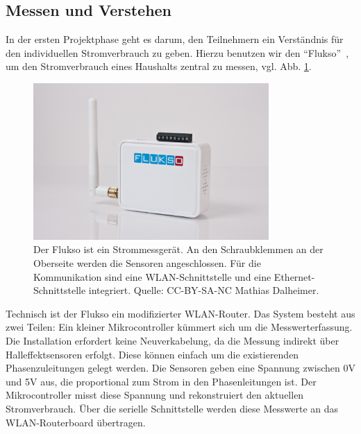 \documentclass[12pt,BCOR=8.5mm]{scrartcl}
\newcommand*\imgwidth{0.8\textwidth}
\begin{document}
\subsection{Messen und Verstehen}\label{sub:messenverstehen}

In der ersten Projektphase geht es darum, den Teilnehmern ein
Verständnis für den individuellen Stromverbrauch zu geben. Hierzu
benutzen wir den "`Flukso"'~\cite{web:flukso}, um den 
Stromverbrauch eines Haushalts zentral zu messen, vgl. 
Abb. \ref{fig:flukso}.
\begin{figure}[htbp]
  \begin{center}
    \includegraphics[width=\imgwidth]{figures/Flukso.jpg}
    \caption{Der Flukso ist ein Strommessgerät. An den Schraubklemmen
    an der Oberseite werden die Sensoren angeschlossen. Für die
    Kommunikation sind eine WLAN-Schnittstelle und eine
    Ethernet-Schnittstelle integriert. Quelle: CC-BY-SA-NC Mathias
    Dalheimer.}
    \label{fig:flukso}
  \end{center}
\end{figure}
Technisch ist der Flukso ein modifizierter WLAN-Router. Das System
besteht aus zwei Teilen: Ein kleiner Mikrocontroller kümmert sich um die
Messwerterfassung. Die Installation erfordert keine Neuverkabelung, da
die Messung indirekt über Halleffektsensoren erfolgt. Diese können
einfach um die existierenden Phasenzuleitungen gelegt werden. Die
Sensoren geben eine Spannung zwischen 0V und 5V aus, die proportional
zum Strom in den Phasenleitungen ist. Der Mikrocontroller misst diese
Spannung und rekonstruiert den aktuellen Stromverbrauch. Über die
serielle Schnittstelle werden diese Messwerte an das WLAN-Routerboard
übertragen. 
\end{document}
